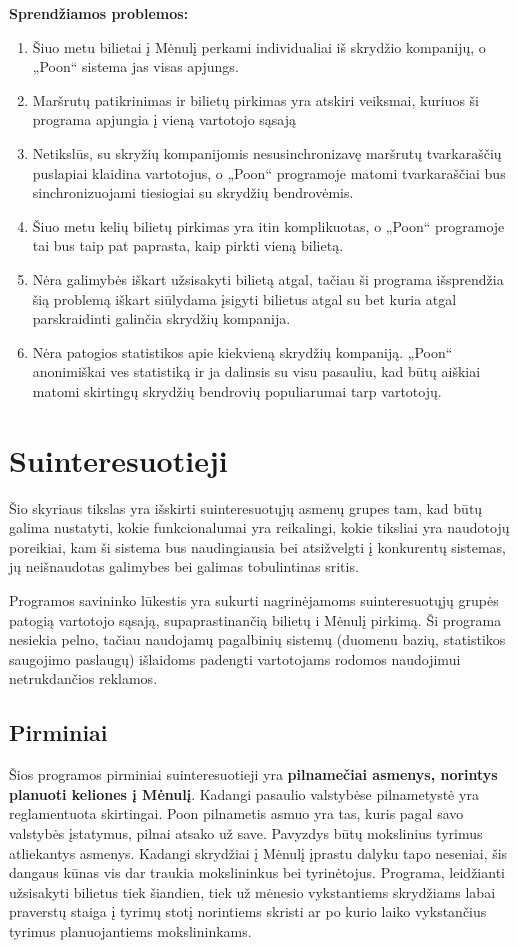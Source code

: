 \documentclass{VUMIFPSkursinis}
\begin{document}
\bigskip
\textbf{Sprendžiamos problemos: }
\begin{enumerate}
\item Šiuo metu bilietai į Mėnulį perkami individualiai iš skrydžio kompanijų, o „Poon“ sistema jas visas apjungs.
\item Maršrutų patikrinimas ir bilietų pirkimas yra atskiri veiksmai, kuriuos ši programa apjungia į vieną vartotojo sąsają
\item Netikslūs, su skryžių kompanijomis nesusinchronizavę maršrutų tvarkaraščių puslapiai klaidina vartotojus, o „Poon“ programoje matomi tvarkaraščiai bus sinchronizuojami tiesiogiai su skrydžių bendrovėmis.
\item Šiuo metu kelių bilietų pirkimas yra itin komplikuotas, o „Poon“ programoje tai bus taip pat paprasta, kaip pirkti vieną bilietą.
\item Nėra galimybės iškart užsisakyti bilietą atgal, tačiau ši programa išsprendžia šią problemą iškart siūlydama įsigyti bilietus atgal su bet kuria atgal parskraidinti galinčia skrydžių kompanija.
\item Nėra patogios statistikos apie kiekvieną skrydžių kompaniją. „Poon“ anonimiškai ves statistiką ir ja dalinsis su visu pasauliu, kad būtų aiškiai matomi skirtingų skrydžių bendrovių populiarumai tarp vartotojų.
\end{enumerate}

\section{Suinteresuotieji}
Šio skyriaus tikslas yra išskirti suinteresuotųjų asmenų grupes tam, kad būtų galima nustatyti, kokie funkcionalumai yra reikalingi, kokie tiksliai yra naudotojų poreikiai, kam ši sistema bus naudingiausia bei atsižvelgti į konkurentų sistemas, jų neišnaudotas galimybes bei galimas tobulintinas sritis.

Programos savininko lūkestis yra sukurti nagrinėjamoms suinteresuotųjų grupės patogią vartotojo sąsają, supaprastinančią bilietų i Mėnulį pirkimą. Ši programa nesiekia pelno, tačiau naudojamų pagalbinių sistemų (duomenu bazių, statistikos saugojimo paslaugų) išlaidoms padengti vartotojams rodomos naudojimui netrukdančios reklamos.

\subsection{Pirminiai} 
Šios programos pirminiai suinteresuotieji yra \textbf{pilnamečiai asmenys, norintys planuoti keliones į Mėnulį}. Kadangi pasaulio valstybėse pilnametystė yra reglamentuota skirtingai. Poon pilnametis asmuo yra tas, kuris pagal savo valstybės įstatymus, pilnai atsako už save. Pavyzdys būtų mokslinius tyrimus atliekantys asmenys. Kadangi skrydžiai į Mėnulį įprastu dalyku tapo neseniai, šis dangaus kūnas vis dar traukia mokslininkus bei tyrinėtojus. Programa, leidžianti užsisakyti bilietus tiek šiandien, tiek už mėnesio vykstantiems skrydžiams labai praverstų staiga į tyrimų stotį norintiems skristi ar po kurio laiko vykstančius tyrimus planuojantiems mokslininkams. 
\end{document}
